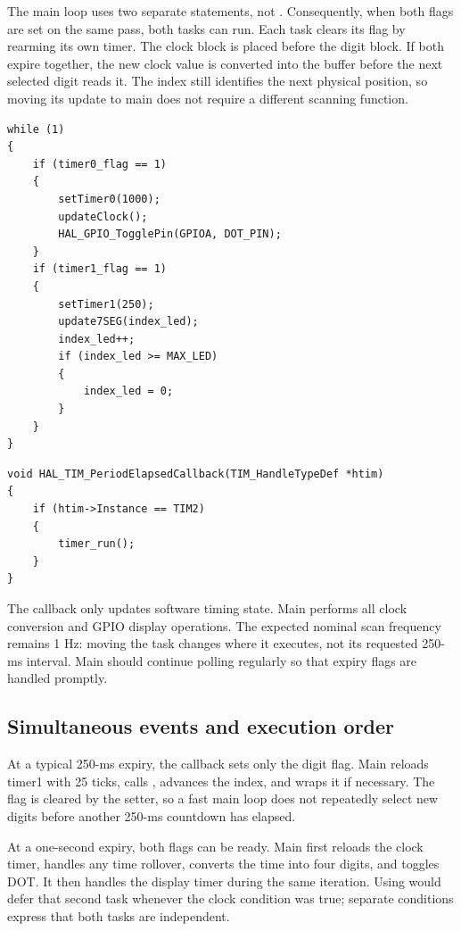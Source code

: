 \documentclass[a4paper]{article}
\newcommand{\code}[1]{\texttt{\detokenize{#1}}}
\newcommand{\topic}[1]{\subsection{#1}}
\begin{document}
The main loop uses two separate \code{if} statements, not \code{if/else}.
Consequently, when both flags are set on the same pass, both tasks can run.
Each task clears its flag by rearming its own timer.
The clock block is placed before the digit block. If both expire together,
the new clock value is converted into the buffer before the next selected
digit reads it. The index still identifies the next physical position, so
moving its update to main does not require a different scanning function.
\par\noindent\begin{minipage}{\linewidth}
\begin{lstlisting}[caption={Exercise 8 replacement main loop}]
while (1)
{
    if (timer0_flag == 1)
    {
        setTimer0(1000);
        updateClock();
        HAL_GPIO_TogglePin(GPIOA, DOT_PIN);
    }
    if (timer1_flag == 1)
    {
        setTimer1(250);
        update7SEG(index_led);
        index_led++;
        if (index_led >= MAX_LED)
        {
            index_led = 0;
        }
    }
}
\end{lstlisting}
\end{minipage}\par
\par\noindent\begin{minipage}{\linewidth}
\begin{lstlisting}[caption={Timer-maintenance-only callback}]
void HAL_TIM_PeriodElapsedCallback(TIM_HandleTypeDef *htim)
{
    if (htim->Instance == TIM2)
    {
        timer_run();
    }
}
\end{lstlisting}
\end{minipage}\par
The callback only updates software timing state. Main performs all clock
conversion and GPIO display operations. The expected nominal scan frequency
remains 1 Hz: moving the task changes where it executes, not its requested
250-ms interval. Main should continue polling regularly so that expiry flags
are handled promptly.

\topic{Simultaneous events and execution order}
At a typical 250-ms expiry, the callback sets only the digit flag. Main
reloads timer1 with 25 ticks, calls \code{update7SEG(index_led)}, advances
the index, and wraps it if necessary. The flag is cleared by the setter,
so a fast main loop does not repeatedly select new digits before another
250-ms countdown has elapsed.

At a one-second expiry, both flags can be ready. Main first reloads the
clock timer, handles any time rollover, converts the time into four digits,
and toggles DOT. It then handles the display timer during the same iteration.
Using \code{else if} would defer that second task whenever the clock condition
was true; separate conditions express that both tasks are independent.
\end{document}

